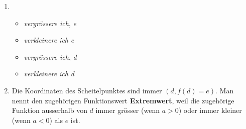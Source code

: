 \documentclass[12pt]{article}
\begin{document}
\begin{solution}
\begin{enumerate}
\item \begin{itemize}
\item \emph{vergrössere ich}, \emph{e}
\item \emph{verkleinere ich} \emph{e}
\item \emph{vergrössere ich}, \emph{d}
\item \emph{verkleinere ich} \emph{d}
\end{itemize}
\item Die Koordinaten des Scheitelpunktes sind immer $(d,f(d)=e)$. Man nennt den zugehörigen Funktionswert \textbf{Extremwert}, weil die zugehörige Funktion ausserhalb von $d$  immer grösser (wenn $a > 0$) oder immer kleiner (wenn $a<0$) als $e$ ist.
\end{enumerate}
\end{solution}
\end{document}
